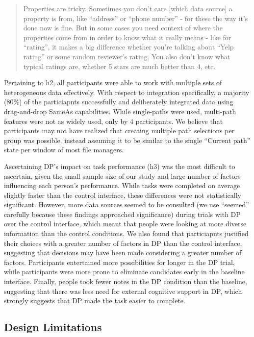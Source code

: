 \documentclass{sigchi}
\begin{document}
\begin{quote}
Properties are tricky. Sometimes you don’t care [which data source] a property is from, like ``address'' or ``phone number'' - for these the way it’s done now is fine. But in some cases you need context of where the properties come from in order to know what it really means - like for ``rating'', it makes a big difference whether you’re talking about ``Yelp rating'' or some random reviewer's rating.  You also don’t know what typical ratings are, whether 5 stars are much better than 4, etc.
\end{quote}

Pertaining to h2, all participants were able to work with multiple sets of heterogeneous data effectively.  With respect to integration specifically, a majority (80\%) of the particiapnts successfully and deliberately integrated data using drag-and-drop SameAs capabilities.  While single-paths were used, multi-path features were not as widely used, only by 4 participants. We believe that participants may not have realized that creating multiple path selections per group was possible, instead assuming it to be similar to the single ``Current path'' state per window of most file managers. 

Ascertaining DP's impact on task performance (h3) was the most difficult to ascertain, given the small sample size of our study and large number of factors influencing each person's performance.  While tasks were completed on average slightly faster than the control interface, these differences were not statistically significant.  However, more data sources seemed to be consulted (we use ``seemed'' carefully because these findings approached significance) during trials with DP over the control interface, which meant that people were looking at more diverse information than the control conditions.  We also found that particiapnts justified their choices with a greater number of factors in DP than the control interface, suggesting that decisions may have been made considering a greater number of factors.  Participants entertained more possibilities for longer in the DP trial, while participants were more prone to eliminate candidates early in the baseline interface.  Finally, people took fewer notes in the DP condition than the baseline, suggesting that there was less need for external cognitive support in DP, which strongly suggests that DP made the task easier to complete.

\subsection{Design Limitations}
\end{document}
